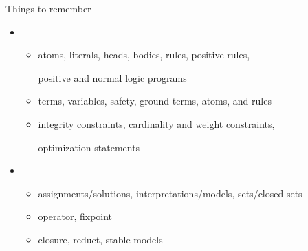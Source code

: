 \begin{frame}{Things to remember}
  \medskip
  \begin{itemize}
  \item {}
    \begin{itemize}\normalsize
    \item atoms, literals, heads, bodies, rules, positive rules,

      positive and normal \alert{logic programs}
      \smallskip
    \item terms, variables, safety, ground terms, atoms, and rules
      \smallskip
    \item integrity constraints, cardinality and weight constraints,

      optimization statements
    \end{itemize}
  \bigskip
  \item {}
    \begin{itemize}\normalsize
    \item assignments/solutions, interpretations/models, sets/closed sets
      \smallskip
    \item {} operator, fixpoint
      \smallskip
    \item closure, reduct, \alert{stable models}
    \end{itemize}
  \end{itemize}
\end{frame}
%
